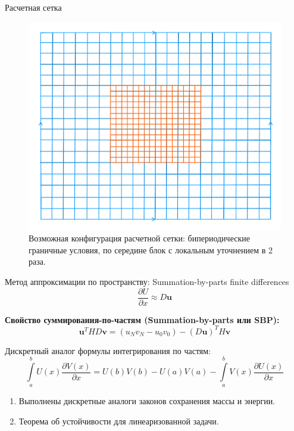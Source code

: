 \documentclass[10pt]{beamer}
\begin{document}
\begin{frame}{Расчетная сетка}

\begin{figure}[h]
\centering
\includegraphics[width=0.8\linewidth]{./images/domain.png}
\caption{Возможная конфигурация расчетной сетки: бипериодические граничные условия, по середине блок с локальным уточнением в 2 раза.}
\label{fig:mpr}
\end{figure}

\end{frame}



\begin{frame}{Метод аппроксимации по пространству: Summation-by-parts finite differences}
$$\frac{\partial U}{\partial x}\approx D\textbf{u}$$

\textbf{Свойство суммирования-по-частям (Summation-by-parts или SBP):}
$$\textbf{u}^T HD \textbf{v} = (u_N v_N - u_0 v_0) -(D\textbf{u})^T H \textbf{v}$$

Дискретный аналог формулы интегрирования по частям:
$$\int\limits_{a}^bU(x)\frac{\partial V(x)}{\partial x}=U(b)V(b)-U(a)V(a)-\int\limits_{a}^b {V(x)\frac{\partial U(x)}{\partial x}}$$

\begin{enumerate}
 \item Выполнены дискретные аналоги законов сохранения массы и энергии.
 \item Теорема об устойчивости для линеаризованной задачи.
\end{enumerate}
\end{frame}
\end{document}
